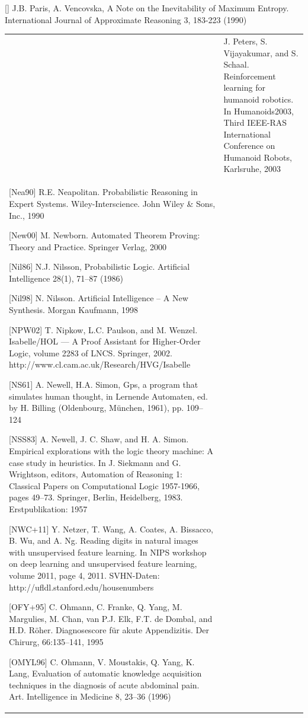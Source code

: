 \documentclass[10pt]{book}
\begin{document}
[\cite{paris1990maxent}] J.B. Paris, A. Vencovska, A Note on the Inevitability of Maximum Entropy. International Journal of Approximate Reasoning 3, 183-223 (1990)
\begin{tabular}{|l|l|}
\hline [\cite{peters2003humanoid}] & J. Peters, S. Vijayakumar, and S. Schaal. Reinforcement learning for humanoid robotics. In Humanoids2003, Third IEEE-RAS International Conference on Humanoid Robots, Karlsruhe, 2003 \\
[Nea90] R.E. Neapolitan. Probabilistic Reasoning in Expert Systems. Wiley-Interscience. John Wiley \& Sons, Inc., 1990

[New00] M. Newborn. Automated Theorem Proving: Theory and Practice. Springer Verlag, 2000

[Nil86] N.J. Nilsson, Probabilistic Logic. Artificial Intelligence 28(1), 71–87 (1986)

[Nil98] N. Nilsson. Artificial Intelligence – A New Synthesis. Morgan Kaufmann, 1998

[NPW02] T. Nipkow, L.C. Paulson, and M. Wenzel. Isabelle/HOL — A Proof Assistant for Higher-Order Logic, volume 2283 of LNCS. Springer, 2002. http://www.cl.cam.ac.uk/Research/HVG/Isabelle

[NS61] A. Newell, H.A. Simon, Gps, a program that simulates human thought, in Lernende Automaten, ed. by H. Billing (Oldenbourg, München, 1961), pp. 109–124

[NSS83] A. Newell, J. C. Shaw, and H. A. Simon. Empirical explorations with the logic theory machine: A case study in heuristics. In J. Siekmann and G. Wrightson, editors, Automation of Reasoning 1: Classical Papers on Computational Logic 1957-1966, pages 49–73. Springer, Berlin, Heidelberg, 1983. Erstpublikation: 1957

[NWC+11] Y. Netzer, T. Wang, A. Coates, A. Bissacco, B. Wu, and A. Ng. Reading digits in natural images with unsupervised feature learning. In NIPS workshop on deep learning and unsupervised feature learning, volume 2011, page 4, 2011. SVHN-Daten: http://ufldl.stanford.edu/housenumbers

[OFY+95] C. Ohmann, C. Franke, Q. Yang, M. Margulies, M. Chan, van P.J. Elk, F.T. de Dombal, and H.D. Röher. Diagnosescore für akute Appendizitis. Der Chirurg, 66:135–141, 1995

[OMYL96] C. Ohmann, V. Moustakis, Q. Yang, K. Lang, Evaluation of automatic knowledge acquisition techniques in the diagnosis of acute abdominal pain. Art. Intelligence in Medicine 8, 23–36 (1996)


\end{tabular}
\end{document}
